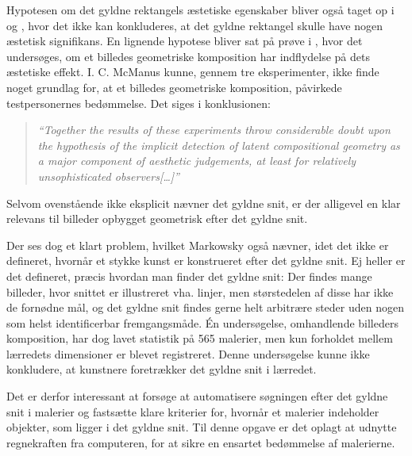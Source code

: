 {Hypotesen om det gyldne rektangels æstetiske egenskaber bliver også
taget op i \cite{Boselie1984} og \cite{Plug1980}, hvor det ikke kan
konkluderes, at det gyldne rektangel skulle have nogen æstetisk
signifikans. En lignende hypotese bliver sat på prøve i
\cite{McManus1995}, hvor det undersøges, om et billedes geometriske
komposition har indflydelse på dets æstetiske effekt. I. C. McManus
kunne, gennem tre eksperimenter, ikke finde noget grundlag for, at et
billedes geometriske komposition, påvirkede testpersonernes bedømmelse.
Det siges i konklusionen:

\begin{quote}
	\emph{``Together the results of these experiments throw
	considerable doubt upon the hypothesis of the implicit detection
	of latent compositional geometry as a major component of
	aesthetic judgements, at least for relatively unsophisticated
	observers[\dots]''}
\end{quote}

Selvom ovenstående ikke eksplicit nævner det gyldne snit, er der
alligevel en klar relevans til billeder opbygget geometrisk efter det
gyldne snit.

Der ses dog et klart problem, hvilket Markowsky også nævner, idet det
ikke er defineret, hvornår et stykke kunst er konstrueret efter det
gyldne snit. Ej heller er det defineret, præcis hvordan man finder det
gyldne snit: Der findes mange billeder, hvor snittet er illustreret vha.
linjer, men størstedelen af disse har ikke de fornødne mål, og det
gyldne snit findes gerne helt arbitrære steder uden nogen som helst
identificerbar fremgangsmåde.  Én undersøgelse, omhandlende billeders
komposition, har dog lavet statistik på 565 malerier, men kun forholdet
mellem lærredets dimensioner er blevet registreret\cite{Olariu1999}.
Denne undersøgelse kunne ikke konkludere, at kunstnere foretrækker det
gyldne snit i lærredet.

Det er derfor interessant at forsøge at automatisere søgningen efter det
gyldne snit i malerier og fastsætte klare kriterier for, hvornår et
malerier indeholder objekter, som ligger i det gyldne snit.  Til denne
opgave er det oplagt at udnytte regnekraften fra computeren, for at
sikre en ensartet bedømmelse af malerierne.

}
